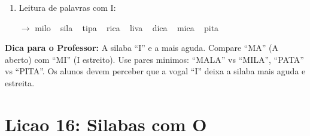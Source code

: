 \begin{exercicio}
\begin{enumerate}[resume]
  \item Leitura de palavras com I:
  \begin{center}
  $\rightarrow$ milo  ~  sila  ~  tipa  ~  rica  ~  liva  ~  dica  ~  mica  ~  pita
  \end{center}
\end{enumerate}
\end{exercicio}

\begin{dica}
\textbf{Dica para o Professor:} A silaba ``I'' e a mais aguda. Compare ``MA'' (A aberto) com ``MI'' (I estreito). Use pares minimos: ``MALA'' vs ``MILA'', ``PATA'' vs ``PITA''. Os alunos devem perceber que a vogal ``I'' deixa a silaba mais aguda e estreita.
\end{dica}

\section{Licao 16: Silabas com O}

\rotinasimples
{}



